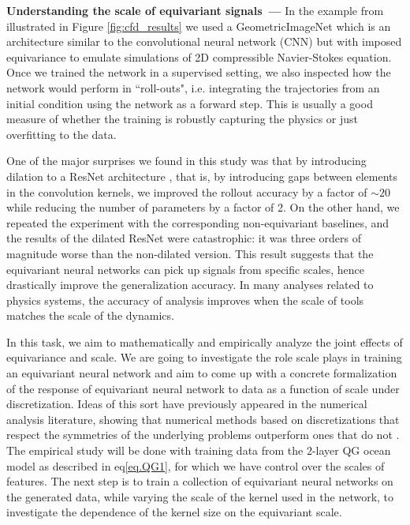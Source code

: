 \documentclass[11pt]{article}
\renewcommand{\paragraph}[1]{\medskip\par\noindent\textbf{#1~---}}
\begin{document}
\paragraph{Understanding the scale of equivariant signals}
In the example from \cite{gregory2024robust} illustrated in Figure \ref{fig:cfd_results} we used a GeometricImageNet which is an architecture similar to the convolutional neural network (CNN) but with imposed equivariance to emulate simulations of 2D compressible Navier-Stokes equation. 
Once we trained the network in a supervised setting, we also inspected how the network would perform in ``roll-outs", i.e. integrating the trajectories from an initial condition using the network as a forward step. This is usually a good measure of whether the training is robustly capturing the physics or just overfitting to the data.

One of the major surprises we found in this study was that by introducing dilation to a ResNet architecture \cite{yu2017dilated}, that is, by introducing gaps between elements in the convolution kernels, we improved the rollout accuracy by a factor of $\sim 20$ while reducing the number of parameters by a factor of 2. On the other hand, we repeated the experiment with the corresponding non-equivariant baselines, and the results of the dilated ResNet were catastrophic: it was three orders of magnitude worse than the non-dilated version. This result suggests that the equivariant neural networks can pick up signals from specific scales, hence drastically improve the generalization accuracy. In many analyses related to physics systems, the accuracy of analysis improves when the scale of tools matches the scale of the dynamics.

In this task, we aim to mathematically and empirically analyze the joint effects of equivariance and scale.
We are going to investigate the role scale plays in training an equivariant neural network and aim to come up with a concrete formalization of the response of equivariant neural network to data as a function of scale under discretization. Ideas of this sort have previously appeared in the numerical analysis literature, showing that numerical methods based on discretizations that respect the symmetries of the underlying problems outperform ones that do not \cite{verstappen2003symmetry}.  The empirical study will be done with training data from the 2-layer QG ocean model as described in eq\ref{eq.QG1}, for which we have control over the scales of features. The next step is to train a collection of equivariant neural networks on the generated data, while varying the scale of the kernel used in the network, to investigate the dependence of the kernel size on the equivariant scale.
\end{document}
